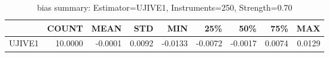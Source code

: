 \begin{table}[ht]
\centering
\caption{bias summary: Estimator=UJIVE1, Instruments=250, Strength=0.70}
\begin{tabular}{lrrrrrrrr}
\toprule
 & COUNT & MEAN & STD & MIN & 25\% & 50\% & 75\% & MAX \\
\midrule
UJIVE1 & 10.0000 & -0.0001 & 0.0092 & -0.0133 & -0.0072 & -0.0017 & 0.0074 & 0.0129 \\
\bottomrule
\end{tabular}
\end{table}
